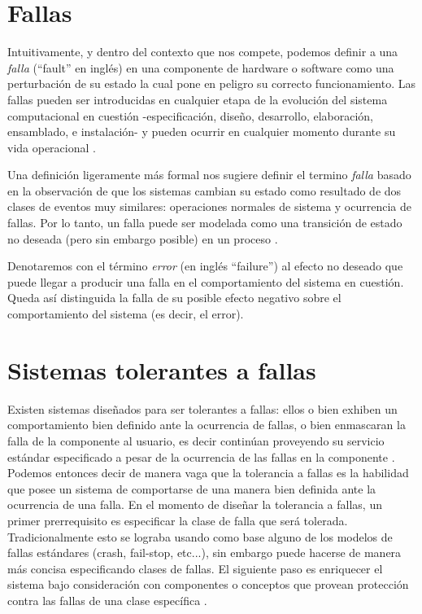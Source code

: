 \documentclass[pdftex,a4paper,12pt]{book}
\begin{document}
\section{Fallas}
Intuitivamente, y dentro del contexto que nos compete, podemos definir a una \textit{falla} (``fault'' en ingl\'es) en una componente de hardware o software como una perturbaci\'on de su estado la cual pone en peligro su correcto funcionamiento. Las fallas pueden ser introducidas en cualquier etapa de la evoluci\'on del sistema computacional en cuesti\'on -especificaci\'on, dise\~no, desarrollo, elaboraci\'on, ensamblado, e instalaci\'on- y pueden ocurrir en cualquier momento durante su vida operacional \cite{FaultInject}.

Una definici\'on ligeramente m\'as formal nos sugiere definir el termino \textit{falla} basado en la observaci\'on de que los sistemas cambian su estado como resultado de dos clases de eventos muy similares: operaciones normales de sistema y ocurrencia de fallas. Por lo tanto, un falla puede ser modelada como una transici\'on de estado no deseada (pero sin embargo posible) en un proceso \cite{Felix}.

Denotaremos con el t\'ermino \textit{error} (en ingl\'es ``failure'') al efecto no deseado que puede llegar a producir una falla en el comportamiento del sistema en cuesti\'on. Queda as\'i distinguida la falla de su posible efecto negativo sobre el comportamiento del sistema (es decir, el error).






\section{Sistemas tolerantes a fallas}
Existen sistemas dise\~nados para ser tolerantes a fallas: ellos o bien exhiben un comportamiento bien definido ante la ocurrencia de fallas, o bien enmascaran la falla de la componente al usuario, es decir contin\'uan proveyendo su servicio est\'andar especificado a pesar de la ocurrencia de las fallas en la componente \cite{Cristian}. Podemos entonces decir de manera vaga que la tolerancia a fallas es la habilidad que posee un sistema de comportarse de una manera bien definida ante la ocurrencia de una falla. En el momento de dise\~nar la tolerancia a fallas, un primer prerrequisito es especificar la clase de falla que ser\'a tolerada. Tradicionalmente esto se lograba usando como base alguno de los modelos de fallas est\'andares (crash, fail-stop, etc...), sin embargo puede hacerse de manera m\'as concisa especificando clases de fallas. El siguiente paso es enriquecer el sistema bajo consideraci\'on con componentes o conceptos que provean protecci\'on contra las fallas de una clase espec\'ifica \cite{FaultInject}.
\end{document}
